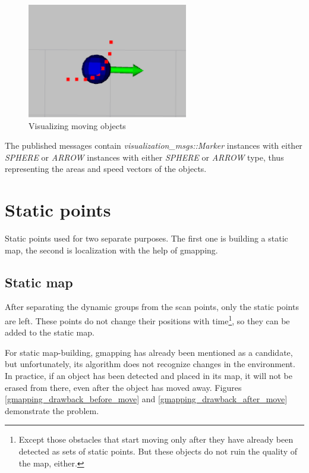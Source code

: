 \begin{figure}[!ht]
    \centering
    \includegraphics[height=50mm]{figures/raw/rviz_moving_object.png}
    \caption{Visualizing moving objects}
    \label{rviz_moving_object}
\end{figure}

The published messages contain \textit{visualization\_msgs::Marker} instances with either \textit{SPHERE} or \textit{ARROW} instances with either \textit{SPHERE} or \textit{ARROW} type, thus representing the areas and speed vectors of the objects.

\section{Static points}
Static points used for two separate purposes. The first one is building a static map, the second is localization with the help of gmapping.

\subsection{Static map}
\label{chap:static_map}
After separating the dynamic groups from the scan points, only the static points are left. These points do not change their positions with time\footnote{Except those obstacles that start moving only after they have already been detected as sets of static points. But these objects do not ruin the quality of the map, either.}, so they can be added to the static map.

For static map-building, gmapping has already been mentioned as a candidate, but unfortunately, its algorithm does not recognize changes in the environment. In practice, if an object has been detected and placed in its map, it will not be erased from there, even after the object has moved away. Figures \ref{gmapping_drawback_before_move} and \ref{gmapping_drawback_after_move} demonstrate the problem.

